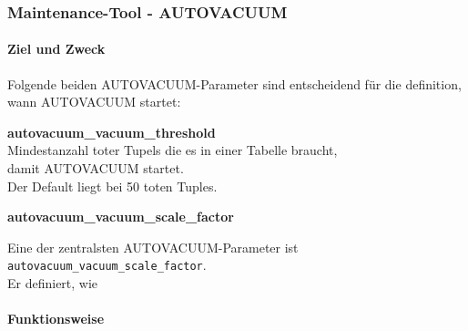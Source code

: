 
\begin{flushleft}
    \subsubsection{Maintenance-Tool - AUTOVACUUM}
    \paragraph{Ziel und Zweck}
    Folgende beiden \Gls{AUTOVACUUM}-Parameter sind entscheidend für die definition, wann \Gls{AUTOVACUUM} startet:
    \begin{description}
        \item \textbf{autovacuum\_vacuum\_threshold}\hfill \\Mindestanzahl toter Tupels die es in einer Tabelle braucht,\\damit \Gls{AUTOVACUUM} startet.\\Der Default liegt bei 50 toten Tuples.
        \item \textbf{autovacuum\_vacuum\_scale\_factor}\hfill \\
    \end{description}

    Eine der zentralsten \Gls{AUTOVACUUM}-Parameter ist \texttt{autovacuum\_vacuum\_scale\_factor}.\\
    Er definiert, wie
    \paragraph{Funktionsweise}
\end{flushleft}